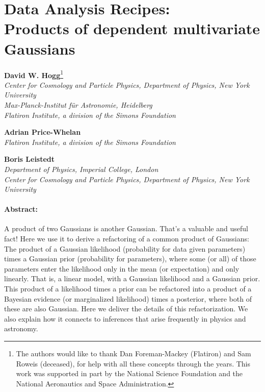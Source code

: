 \addtolength{\topmargin}{-0.75in}
\addtolength{\textheight}{1.5in}
\setlength{\parindent}{\baselineskip}
\raggedbottom\sloppy\sloppypar\frenchspacing


\usepackage{color}
\newcommand{\bl}[1]{\textcolor{red}{[BL: #1]}}



\section*{Data Analysis Recipes:\\ Products of dependent multivariate Gaussians}

\noindent\textbf{David W. Hogg}\footnote{%
The authors would like to thank
  Dan Foreman-Mackey (Flatiron) and
  Sam Roweis (deceased),
for help with all these concepts through the years.
This work was supported in part by the National Science Foundation
and the National Aeronautics and Space Administration.
}\\
{\footnotesize%
  \textsl{Center for Cosmology and Particle Physics, Department of Physics, New York University}\\
  \textsl{Max-Planck-Institut f\"ur Astronomie, Heidelberg}\\
  \textsl{Flatiron Institute, a division of the Simons Foundation}%
}

\medskip\noindent\textbf{Adrian Price-Whelan}\\
{\footnotesize%
  \textsl{Flatiron Institute, a division of the Simons Foundation}%
}

\medskip\noindent\textbf{Boris Leistedt}\\
{\footnotesize%
  \textsl{Department of Physics, Imperial College, London}\\
  \textsl{Center for Cosmology and Particle Physics, Department of Physics, New York University}%
}

\paragraph{Abstract:}
A product of two Gaussians is another Gaussian.
That's a valuable and useful fact!
Here we use it to derive a refactoring of a common product of
Gaussians:
The product of a Gaussian likelihood (probability for data given
parameters) times a Gaussian prior (probability for parameters),
where some (or all) of those parameters enter the likelihood
only in the mean (or expectation) and only linearly.
That is, a linear model, with a Gaussian likelihood and a Gaussian
prior.
This product of a likelihood times a prior can be refactored into a
product of a Bayesian evidence (or marginalized likelihood)
times a posterior, where both of these are also Gaussian.
Here we deliver the details of this refactorization.
We also explain how it connects to inferences that arise frequently in
physics and astronomy.

